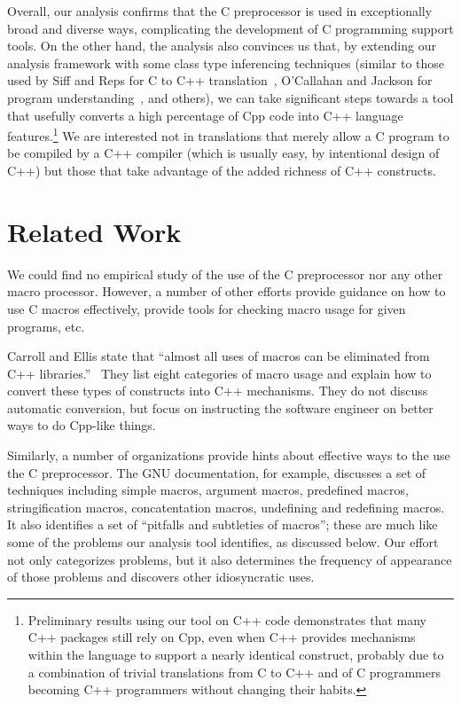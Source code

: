 Overall, our analysis confirms that the C preprocessor is used in
exceptionally broad and diverse ways, complicating the development of
C programming support tools.  On the other hand, the analysis also
convinces us that, by extending our analysis framework with some class
type inferencing techniques (similar to those used by Siff and Reps
for C to C++ translation~\cite{Siff-fse96}, O'Callahan and Jackson for
program understanding~\cite{OCallahan-icse97}, and others), we can
take significant steps towards a tool that usefully converts a high
percentage of Cpp code into C++ language
features.\footnote{Preliminary results using our tool on C++ code
demonstrates that many C++ packages still rely on Cpp, even when C++
provides mechanisms within the language to support a nearly identical
construct, probably due to a combination of trivial
translations from C to C++ and of C programmers becoming C++
programmers without changing their habits.}  We are
interested not in translations that merely allow a C program to be
compiled by a C++ compiler (which is usually easy, by intentional
design of C++) but those that take advantage of the added richness of C++
constructs.


\section{Related Work}\label{sec:related}

We could find no empirical study of the use of the C preprocessor nor
any other macro processor.  However, a number of other efforts provide
guidance on how to use C macros effectively, provide tools for
checking macro usage for given programs, etc.

Carroll and Ellis state that ``almost all uses of macros can be
eliminated from C++ libraries.''~\cite[p.146]{Carroll95} 
They list eight categories of macro usage and explain how to convert
these types of constructs into C++ mechanisms.  They do not
discuss automatic conversion, but  focus on instructing the
software engineer on better ways to do Cpp-like things.

Similarly, a number of organizations provide hints about effective
ways to the use the C preprocessor.  The GNU documentation, for example,
discusses a set of techniques including simple macros, argument
macros, predefined macros, stringification macros, concatentation
macros, undefining and redefining
macros.
It also identifies a set of ``pitfalls and subtleties of
macros''; these are much like some of the problems our analysis tool
identifies, as discussed below.  Our effort not only categorizes
problems, but it also determines the frequency of appearance of those
problems and discovers other idiosyncratic uses.

